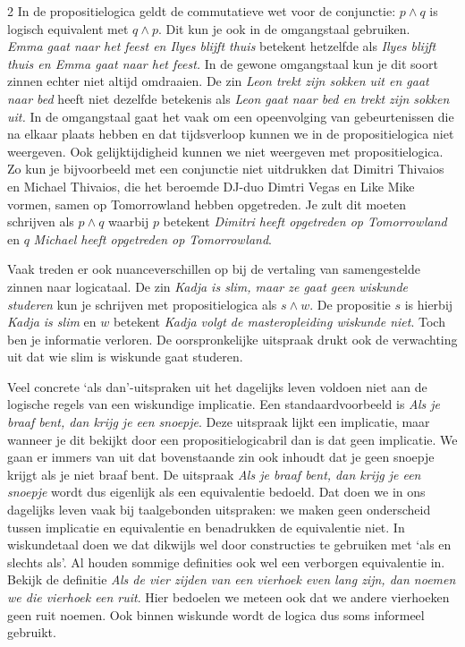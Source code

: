 \begin{multicols}{2}
In de propositielogica geldt de commutatieve wet voor de conjunctie: $p\land q$ is logisch equivalent met $q\land p$. Dit kun je ook in de omgangstaal gebruiken.\\ \textsl{Emma gaat naar het feest en Ilyes blijft thuis} betekent hetzelfde als \textsl{Ilyes blijft thuis en Emma gaat naar het feest.} In de gewone omgangstaal kun je dit soort zinnen echter niet altijd omdraaien. De zin
\textsl{Leon trekt zijn sokken uit en gaat naar bed} heeft niet dezelfde betekenis als
\textsl{Leon gaat naar bed en trekt zijn sokken uit.} In de omgangstaal gaat het vaak om een opeenvolging van gebeurtenissen die na elkaar plaats hebben en dat tijdsverloop kunnen we in de propositielogica niet weergeven. Ook gelijktijdigheid kunnen we niet weergeven met propositielogica. Zo kun je bijvoorbeeld met een conjunctie niet uitdrukken dat Dimitri Thivaios en Michael Thivaios, die het beroemde DJ-duo Dimtri Vegas en Like Mike vormen, samen op Tomorrowland hebben opgetreden. Je zult dit moeten schrijven als $p \land q$ waarbij $p$ betekent \textsl{Dimitri heeft opgetreden op Tomorrowland} en $q$ \textsl{Michael heeft opgetreden op Tomorrowland}.

Vaak treden er ook nuanceverschillen op bij de vertaling van samengestelde zinnen naar logicataal. De zin \textsl{Kadja is slim, maar ze gaat geen wiskunde studeren} kun je schrijven met propositielogica als $s\land w$. De propositie $s$ is hierbij \textsl{Kadja is slim} en $w$ betekent \textsl{Kadja volgt de masteropleiding wiskunde niet}. Toch ben je informatie verloren. De oorspronkelijke uitspraak drukt ook de verwachting uit dat wie slim is wiskunde gaat studeren.

Veel concrete `als dan'-uitspraken uit het dagelijks leven voldoen niet aan de logische regels
van een wiskundige implicatie. Een standaardvoorbeeld is \textsl{Als je braaf bent, dan krijg je
een snoepje}. Deze uitspraak lijkt een implicatie, maar wanneer je dit bekijkt door een propositielogicabril dan is dat geen implicatie. We gaan er immers van uit dat bovenstaande zin ook inhoudt dat je geen snoepje krijgt als je niet braaf bent. De uitspraak \textsl{Als je braaf bent, dan krijg je een snoepje} wordt dus eigenlijk als een equivalentie bedoeld. Dat doen we in ons dagelijks leven vaak bij taalgebonden uitspraken: we maken geen onderscheid tussen implicatie en equivalentie en benadrukken de equivalentie niet. In wiskundetaal doen we dat dikwijls wel door constructies te gebruiken met `als en slechts als'. Al houden sommige definities ook wel een verborgen equivalentie in. Bekijk de definitie \textsl{Als de vier zijden van een vierhoek even lang zijn, dan noemen we die vierhoek een ruit}. Hier bedoelen we meteen ook dat we andere vierhoeken geen ruit noemen. Ook binnen wiskunde wordt de logica dus soms informeel gebruikt.


\end{multicols}
